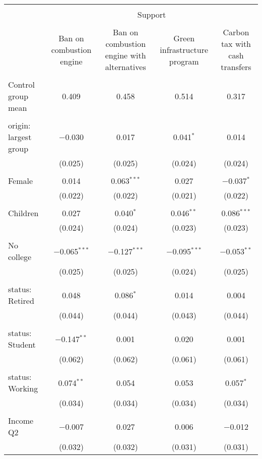 
\begin{tabular}{@{\extracolsep{5pt}}lcccc} 
\\[-1.8ex]\hline 
\hline \\[-1.8ex] 
 & \multicolumn{4}{c}{Support} \\ 
\cline{2-5} 
\\[-1.8ex] & Ban on combustion engine & Ban on combustion engine with alternatives & Green infrastructure program & Carbon tax with cash transfers \\ 
\hline \\[-1.8ex] 
 Control group mean & 0.409 & 0.458 & 0.514 & 0.317  \\ \hline \\[-1.8ex] origin: largest group & $-$0.030 & 0.017 & 0.041$^{*}$ & 0.014 \\ 
  & (0.025) & (0.025) & (0.024) & (0.024) \\ 
  & & & & \\ 
 Female & 0.014 & 0.063$^{***}$ & 0.027 & $-$0.037$^{*}$ \\ 
  & (0.022) & (0.022) & (0.021) & (0.022) \\ 
  & & & & \\ 
 Children & 0.027 & 0.040$^{*}$ & 0.046$^{**}$ & 0.086$^{***}$ \\ 
  & (0.024) & (0.024) & (0.023) & (0.023) \\ 
  & & & & \\ 
 No college & $-$0.065$^{***}$ & $-$0.127$^{***}$ & $-$0.095$^{***}$ & $-$0.053$^{**}$ \\ 
  & (0.025) & (0.025) & (0.024) & (0.025) \\ 
  & & & & \\ 
 status: Retired & 0.048 & 0.086$^{*}$ & 0.014 & 0.004 \\ 
  & (0.044) & (0.044) & (0.043) & (0.044) \\ 
  & & & & \\ 
 status: Student & $-$0.147$^{**}$ & 0.001 & 0.020 & 0.001 \\ 
  & (0.062) & (0.062) & (0.061) & (0.061) \\ 
  & & & & \\ 
 status: Working & 0.074$^{**}$ & 0.054 & 0.053 & 0.057$^{*}$ \\ 
  & (0.034) & (0.034) & (0.034) & (0.034) \\ 
  & & & & \\ 
 Income Q2 & $-$0.007 & 0.027 & 0.006 & $-$0.012 \\ 
  & (0.032) & (0.032) & (0.031) & (0.031) \\ 

\end{tabular}
